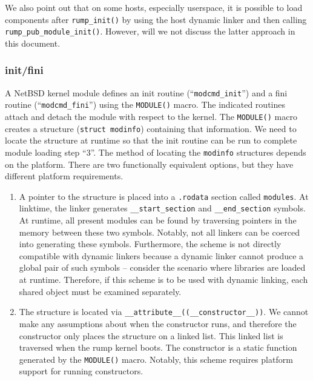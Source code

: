 We also point out that on some hosts, especially userspace, it is
possible to load components after \verb+rump_init()+ by using the host
dynamic linker and then calling \verb+rump_pub_module_init()+.  However,
will we not discuss the latter approach in this document.

\subsubsection*{init/fini}

A NetBSD kernel module defines an init routine
(``\verb+modcmd_init+'') and a fini routine (``\verb+modcmd_fini+'')
using the \verb+MODULE()+ macro.  The indicated routines attach
and detach the module with respect to the kernel.  The \verb+MODULE()+
macro creates a structure (\texttt{struct modinfo}) containing that
information.  We need to locate the structure at runtime so that the
init routine can be run to complete module loading step ``3''.  The method
of locating the \texttt{modinfo} structures depends on the platform.
There are two functionally equivalent options, but they have different
platform requirements.

\begin{enumerate}
\item	A pointer to the structure is placed into a \verb+.rodata+ section
	called \texttt{modules}.  At linktime, the linker generates
	\verb+__start_section+ and \verb+__end_section+ symbols.
	At runtime, all present modules can be found by traversing pointers
	in the memory between these two symbols.  Notably, not all linkers
	can be coerced into generating these symbols.
	Furthermore, the scheme is
	not directly compatible with dynamic linkers because a dynamic
	linker cannot produce a global pair of such symbols -- consider
	the scenario where libraries are loaded at runtime.  Therefore,
	if this scheme is to be used with dynamic linking, each shared
	object must be examined separately.

\item	The structure is located via
	\verb+__attribute__((__constructor__))+.  We cannot make any
	assumptions about when the constructor runs, and therefore the
	constructor only places the structure on a linked list.
	This linked list is traversed when the rump kernel boots.
	The constructor is a static function generated by the
	\texttt{MODULE()} macro.  Notably, this scheme requires platform
	support for running constructors.
\end{enumerate}


